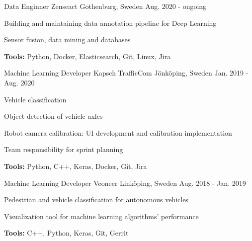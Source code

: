 

\begin{cventries}

  \cventry
    {Data Enginner} %
    {Zenseact} %
    {Gothenburg, Sweden} %
    {Aug. 2020 - ongoing} %
    {
      \begin{cvitems} %
        \item {Building and maintaining data annotation pipeline for Deep Learning}
        \item {Sensor fusion, data mining and databases}
        \item {\textbf{Tools:} Python, Docker, Elasticsearch, Git, Linux, Jira}
      \end{cvitems}
    }

  \cventry
    {Machine Learning Developer} %
    {Kapsch TrafficCom} %
    {Jönköping, Sweden} %
    {Jan. 2019 - Aug. 2020} %
    {
      \begin{cvitems} %
        \item {Vehicle classification}
        \item {Object detection of vehicle axles}
        \item {Robot camera calibration: UI development and calibration implementation}
        \item {Team responsibility for sprint planning}
        \item {\textbf{Tools:} Python, C++, Keras, Docker, Git, Jira}
      \end{cvitems}
    }

  \cventry
    {Machine Learning Developer} %
    {Veoneer} %
    {Linköping, Sweden} %
    {Aug. 2018 - Jan. 2019} %
    {
      \begin{cvitems} %
        \item {Pedestrian and vehicle classification for autonomous vehicles}
        \item {Visualization tool for machine learning algorithms' performance}
        \item {\textbf{Tools:} C++, Python, Keras, Git, Gerrit}
      \end{cvitems}
    }


\end{cventries}
